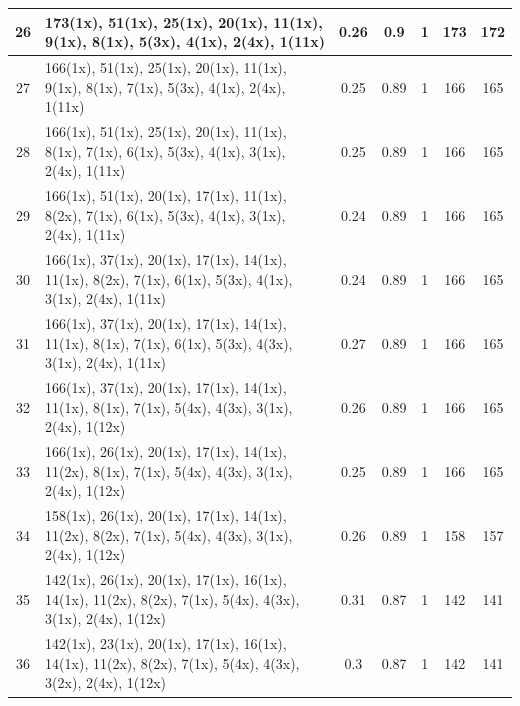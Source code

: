 \begin{small}
\begin{longtable}{|c|p{4cm}|c|c|c|c|c|}
  26 & 173(1x), 51(1x), 25(1x), 20(1x), 11(1x), 9(1x), 8(1x), 5(3x), 4(1x), 2(4x), 1(11x) & \cellcolor{colorGood}  0.26 & \cellcolor{colorGood} 0.9 & 1 & 173 & \cellcolor{colorBad} 172 \\   \hline
  27 & 166(1x), 51(1x), 25(1x), 20(1x), 11(1x), 9(1x), 8(1x), 7(1x), 5(3x), 4(1x), 2(4x), 1(11x) & \cellcolor{colorGood}  0.25 & \cellcolor{colorGood} 0.89 & 1 & 166 & \cellcolor{colorBad} 165 \\   \hline
  28 & 166(1x), 51(1x), 25(1x), 20(1x), 11(1x), 8(1x), 7(1x), 6(1x), 5(3x), 4(1x), 3(1x), 2(4x), 1(11x) & \cellcolor{colorGood}  0.25 & \cellcolor{colorGood} 0.89 & 1 & 166 & \cellcolor{colorBad} 165 \\   \hline
  29 & 166(1x), 51(1x), 20(1x), 17(1x), 11(1x), 8(2x), 7(1x), 6(1x), 5(3x), 4(1x), 3(1x), 2(4x), 1(11x) & \cellcolor{colorGood}  0.24 & \cellcolor{colorGood} 0.89 & 1 & 166 & \cellcolor{colorBad} 165 \\   \hline
  30 & 166(1x), 37(1x), 20(1x), 17(1x), 14(1x), 11(1x), 8(2x), 7(1x), 6(1x), 5(3x), 4(1x), 3(1x), 2(4x), 1(11x) & \cellcolor{colorGood}  0.24 & \cellcolor{colorGood} 0.89 & 1 & 166 & \cellcolor{colorBad} 165 \\   \hline
  31 & 166(1x), 37(1x), 20(1x), 17(1x), 14(1x), 11(1x), 8(1x), 7(1x), 6(1x), 5(3x), 4(3x), 3(1x), 2(4x), 1(11x) & \cellcolor{colorGood}  0.27 & \cellcolor{colorGood} 0.89 & 1 & 166 & \cellcolor{colorBad} 165 \\   \hline
  32 & 166(1x), 37(1x), 20(1x), 17(1x), 14(1x), 11(1x), 8(1x), 7(1x), 5(4x), 4(3x), 3(1x), 2(4x), 1(12x) & \cellcolor{colorGood}  0.26 & \cellcolor{colorGood} 0.89 & 1 & 166 & \cellcolor{colorBad} 165 \\   \hline
  33 & 166(1x), 26(1x), 20(1x), 17(1x), 14(1x), 11(2x), 8(1x), 7(1x), 5(4x), 4(3x), 3(1x), 2(4x), 1(12x) & \cellcolor{colorGood}  0.25 & \cellcolor{colorGood} 0.89 & 1 & 166 & \cellcolor{colorBad} 165 \\   \hline
  34 & 158(1x), 26(1x), 20(1x), 17(1x), 14(1x), 11(2x), 8(2x), 7(1x), 5(4x), 4(3x), 3(1x), 2(4x), 1(12x) & \cellcolor{colorGood}  0.26 & \cellcolor{colorGood} 0.89 & 1 & 158 & \cellcolor{colorBad} 157 \\   \hline
  35 & 142(1x), 26(1x), 20(1x), 17(1x), 16(1x), 14(1x), 11(2x), 8(2x), 7(1x), 5(4x), 4(3x), 3(1x), 2(4x), 1(12x) & \cellcolor{colorGood}  0.31 & \cellcolor{colorGood} 0.87 & 1 & 142 & \cellcolor{colorBad} 141 \\   \hline
  36 & 142(1x), 23(1x), 20(1x), 17(1x), 16(1x), 14(1x), 11(2x), 8(2x), 7(1x), 5(4x), 4(3x), 3(2x), 2(4x), 1(12x) & \cellcolor{colorGood}  0.3 & \cellcolor{colorGood} 0.87 & 1 & 142 & \cellcolor{colorBad} 141 \\   \hline

\end{longtable}
\end{small}
